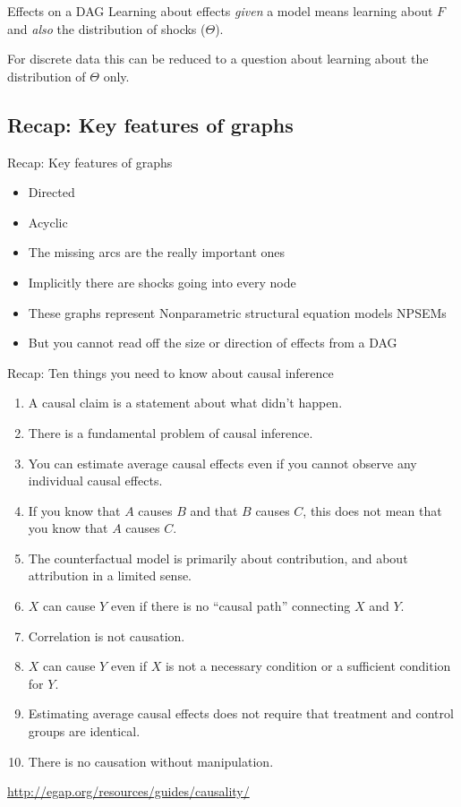 \documentclass[
  11pt,
  ignorenonframetext,
]{beamer}
\providecommand{\tightlist}{%
  \setlength{\itemsep}{0pt}\setlength{\parskip}{0pt}}\usepackage{longtable,booktabs,array}
\begin{document}
\begin{frame}{Effects on a DAG}
\protect\hypertarget{effects-on-a-dag}{}
Learning about effects \emph{given} a model means learning about \(F\)
and \emph{also} the distribution of shocks (\(\Theta\)).

For discrete data this can be reduced to a question about learning about
the distribution of \(\Theta\) only.
\end{frame}

\hypertarget{recap-key-features-of-graphs}{%
\subsection{Recap: Key features of
graphs}\label{recap-key-features-of-graphs}}

\begin{frame}{Recap: Key features of graphs}
\begin{itemize}
\tightlist
\item
  Directed
\item
  Acyclic
\item
  The missing arcs are the really important ones
\item
  Implicitly there are shocks going into every node
\item
  These graphs represent Nonparametric structural equation models NPSEMs
\item
  But you cannot read off the size or direction of effects from a DAG
\end{itemize}
\end{frame}

\begin{frame}{Recap: Ten things you need to know about causal inference}
\protect\hypertarget{recap-ten-things-you-need-to-know-about-causal-inference}{}
\begin{enumerate}
\tightlist
\item
  A causal claim is a statement about what didn't happen.
\item
  There is a fundamental problem of causal inference.
\item
  You can estimate average causal effects even if you cannot observe any
  individual causal effects.
\item
  If you know that \(A\) causes \(B\) and that \(B\) causes \(C\), this
  does not mean that you know that \(A\) causes \(C\).
\item
  The counterfactual model is primarily about contribution, and about
  attribution in a limited sense.
\item
  \(X\) can cause \(Y\) even if there is no ``causal path'' connecting
  \(X\) and \(Y\).
\item
  Correlation is not causation.
\item
  \(X\) can cause \(Y\) even if \(X\) is not a necessary condition or a
  sufficient condition for \(Y\).
\item
  Estimating average causal effects does not require that treatment and
  control groups are identical.
\item
  There is no causation without manipulation.
\end{enumerate}

\url{http://egap.org/resources/guides/causality/}
\end{frame}
\end{document}
